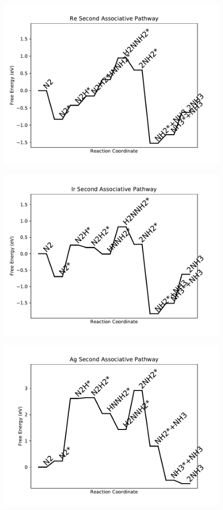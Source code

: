 \begin{figure}
\includegraphics[width=0.8\linewidth]{data/plots/Re_associative_2.pdf}
\end{figure}

\begin{figure}
\includegraphics[width=0.8\linewidth]{data/plots/Ir_associative_2.pdf}
\end{figure}

\begin{figure}
\includegraphics[width=0.8\linewidth]{data/plots/Ag_associative_2.pdf}
\end{figure}

